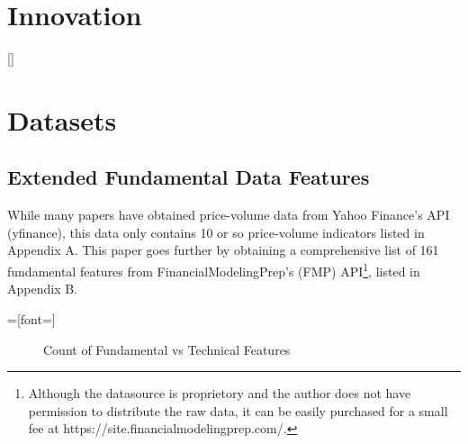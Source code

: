 \documentclass[a4paper,12pt]{report}
\renewcommand\thechapter{\Roman{chapter}}
\numberwithin{equation}{section}
\theoremstyle{definition}
\begin{document}
\titleformat{\chapter}[block]
  {\normalfont\huge\bfseries}{\thechapter.}{1em}{\Huge\centering}
\titlespacing*{\chapter}{0pt}{230pt}{0pt}
\setcounter{chapter}{1}
\renewcommand{\thechapter}{\Roman{chapter}}
\chapter{Innovation}

\titleformat{\chapter}[display]{\Large}{\centering
  \MakeUppercase{\chaptername}\quad{\Huge\thechapter}}{0pt}{\titlerule[.5pt]\vspace{10pt}\centering
  \MakeUppercase}[\vspace{10pt}{\titlerule[.5pt]}]%
\titlespacing{\chapter}{0pt}{-80pt}{1cm}%
\renewcommand{\thechapter}{\arabic{chapter}}
\setcounter{chapter}{3}

\setcounter{page}{15}
\chapter{Datasets}
\section{Extended Fundamental Data Features}
While many papers have obtained price-volume data from Yahoo Finance's API (yfinance), this data only contains 10 or so price-volume indicators listed in Appendix A. This paper goes further by obtaining a comprehensive list of 161 fundamental features from FinancialModelingPrep's (FMP) API\footnote{Although the datasource is proprietory and the author does not have permission to distribute the raw data, it can be easily purchased for a small fee at https://site.financialmodelingprep.com/.}, listed in Appendix B. 

=[font=\large]
\begin{figure}[H]
  \centering
    \caption{Count of Fundamental vs Technical Features}
    \label{fund_tec_pie}
  \end{figure}
\end{document}
